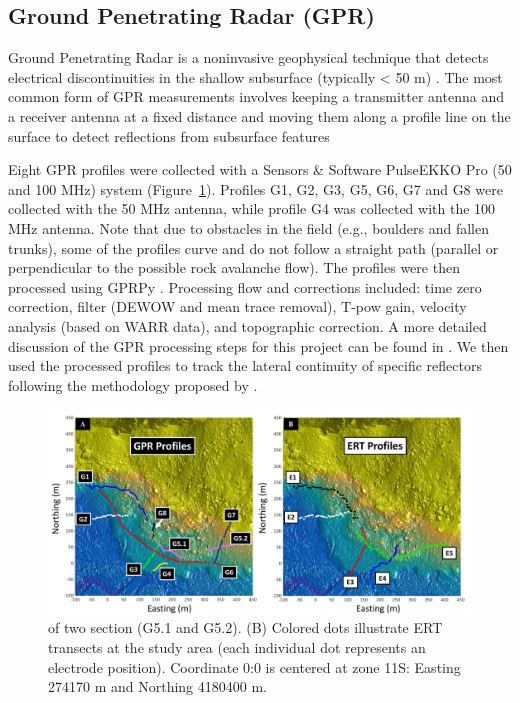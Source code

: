 \documentclass[5p]{elsarticle}
\begin{document}
	\subsection{Ground Penetrating Radar (GPR)}
										
Ground Penetrating Radar is a noninvasive geophysical technique that detects electrical discontinuities in the shallow subsurface (typically < 50 m) \citep{neal2004ground}. The most common form of GPR measurements involves keeping a transmitter antenna and a receiver antenna at a fixed distance and moving them along a profile line on the surface to detect reflections from subsurface features \citep{jol2008ground} 

Eight GPR profiles were collected with a Sensors \& Software PulseEKKO Pro (50 and 100 MHz) system (Figure~\ref{GPR profile 7}). Profiles G1, G2, G3, G5, G6, G7 and G8 were collected with the 50 MHz antenna, while profile G4 was collected with the 100 MHz antenna. Note that due to obstacles in the field (e.g., boulders and fallen trunks), some of the profiles curve and do not follow a straight path (parallel or perpendicular to the possible rock avalanche flow). The profiles were then processed using GPRPy \citep{plattner2019comunity}. Processing flow and corrections included: time zero correction, filter (DEWOW and mean trace removal), T-pow gain, velocity analysis (based on WARR data), and topographic correction. A more detailed discussion of the GPR processing steps for this project can be found in \cite{Pacheco2019geophysical}. We then used the processed profiles to track the lateral continuity of specific reflectors following the methodology proposed by \citep{mitchum1977seismic}. 

											\begin{figure}[h]

	\includegraphics[width=\textwidth]{Figures/GPR_ERT_Map.pdf}
		\caption{of two section (G5.1 and G5.2). (B) Colored dots illustrate ERT transects at the study area (each individual dot represents an electrode position). Coordinate 0:0 is centered at zone 11S: Easting 274170 m and Northing 4180400 m.  \label{GPR profile 7}}

											\end{figure}										
											
\end{document}
